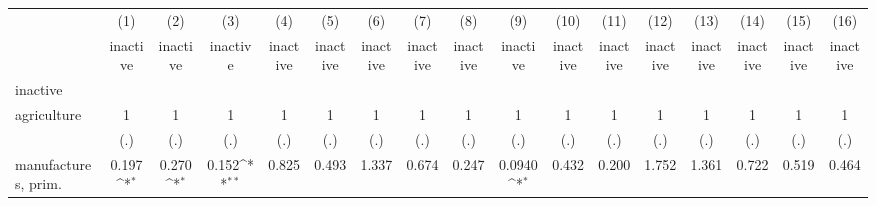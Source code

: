 {
\def\sym#1{\ifmmode^{#1}\else\(^{#1}\)\fi}
\begin{tabular}{l*{16}{c}}
\hline\hline
                    &\multicolumn{1}{c}{(1)}&\multicolumn{1}{c}{(2)}&\multicolumn{1}{c}{(3)}&\multicolumn{1}{c}{(4)}&\multicolumn{1}{c}{(5)}&\multicolumn{1}{c}{(6)}&\multicolumn{1}{c}{(7)}&\multicolumn{1}{c}{(8)}&\multicolumn{1}{c}{(9)}&\multicolumn{1}{c}{(10)}&\multicolumn{1}{c}{(11)}&\multicolumn{1}{c}{(12)}&\multicolumn{1}{c}{(13)}&\multicolumn{1}{c}{(14)}&\multicolumn{1}{c}{(15)}&\multicolumn{1}{c}{(16)}\\
                    &\multicolumn{1}{c}{inactive}&\multicolumn{1}{c}{inactive}&\multicolumn{1}{c}{inactive}&\multicolumn{1}{c}{inactive}&\multicolumn{1}{c}{inactive}&\multicolumn{1}{c}{inactive}&\multicolumn{1}{c}{inactive}&\multicolumn{1}{c}{inactive}&\multicolumn{1}{c}{inactive}&\multicolumn{1}{c}{inactive}&\multicolumn{1}{c}{inactive}&\multicolumn{1}{c}{inactive}&\multicolumn{1}{c}{inactive}&\multicolumn{1}{c}{inactive}&\multicolumn{1}{c}{inactive}&\multicolumn{1}{c}{inactive}\\
\hline
inactive            &                     &                     &                     &                     &                     &                     &                     &                     &                     &                     &                     &                     &                     &                     &                     &                     \\
agriculture         &           1         &           1         &           1         &           1         &           1         &           1         &           1         &           1         &           1         &           1         &           1         &           1         &           1         &           1         &           1         &           1         \\
                    &         (.)         &         (.)         &         (.)         &         (.)         &         (.)         &         (.)         &         (.)         &         (.)         &         (.)         &         (.)         &         (.)         &         (.)         &         (.)         &         (.)         &         (.)         &         (.)         \\
[1em]
manufactures, prim. &       0.197\sym{*}  &       0.270\sym{*}  &       0.152\sym{**} &       0.825         &       0.493         &       1.337         &       0.674         &       0.247         &      0.0940\sym{*}  &       0.432         &       0.200         &       1.752         &       1.361         &       0.722         &       0.519         &       0.464         \\

\end{tabular}}
